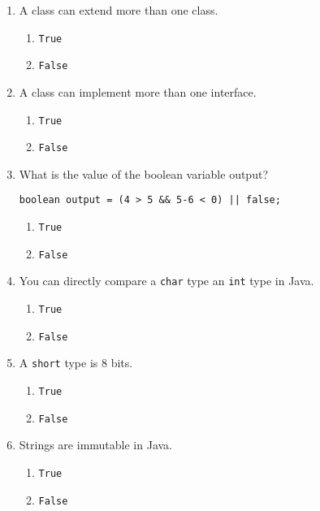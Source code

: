 \documentclass[S17-Final.tex]{subfiles}
\begin{document}
\begin{enumerate}
\item A class can extend more than one class.

\begin{enumerate}
\item  \texttt{True}
\item  \texttt{False} \ifdraft \Ans \fi 
\end{enumerate}

\item A class can implement more than one interface.

\begin{enumerate}
\item  \texttt{True} \ifdraft \Ans \fi 
\item  \texttt{False}  
\end{enumerate}
\clearpage
\item What is the value of the boolean variable output?
\begin{lstlisting}
boolean output = (4 > 5 && 5-6 < 0) || false;
\end{lstlisting}

\begin{enumerate}
\item  \texttt{True}
\item  \texttt{False}  \ifdraft \Ans \fi 
\end{enumerate}

\item You can directly compare a \texttt{char} type an \texttt{int} type in Java.

\begin{enumerate}
\item  \texttt{True} \ifdraft \Ans \fi 
\item  \texttt{False}  
\end{enumerate}

\item A \texttt{short} type is 8 bits.

\begin{enumerate}
\item  \texttt{True}
\item  \texttt{False} \ifdraft \Ans \fi 
\end{enumerate}

\item Strings are immutable in Java.

\begin{enumerate}
\item  \texttt{True} \ifdraft \Ans \fi 
\item  \texttt{False}  
\end{enumerate}


\end{enumerate}
\end{document}
